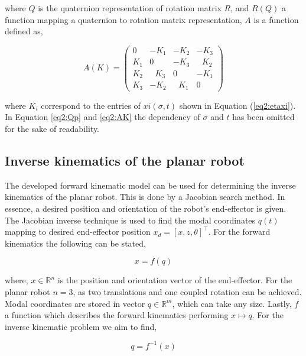 where $Q$ is the quaternion representation of rotation matrix $R$, and $R(Q)$ a function mapping a quaternion to rotation matrix representation, $A$ is a function defined as,


\begin{equation}
    A(K) = \begin{pmatrix} 0 & -K_1 & -K_2 & -K_3 \\ K_1 & 0 & -K_3 & \hspace{8pt}K_2 \\ K_2 & \hspace{8pt}K_3 & 0 & -K_1 \\ K_3 & -K_2 & \hspace{8pt}K_1 & 0 \end{pmatrix}
    \label{eq2:AK}
\end{equation}

where $K_i$ correspond to the entries of $xi(\sigma,t)$ shown in Equation (\ref{eq2:etaxi}). In Equation \ref{eq2:Qp} and \ref{eq2:AK} the dependency of $\sigma$ and $t$ has been omitted for the sake of readability.

\subsection{Inverse kinematics of the planar robot}

The developed forward kinematic model can be used for determining the inverse kinematics of the planar robot. This is done by a Jacobian search method. In essence, a desired position and orientation of the robot's end-effector is given. The Jacobian inverse technique is used to find the modal coordinates $q(t)$ mapping to desired end-effector position $x_d = [x,z,\theta]^\top$. For the forward kinematics the following can be stated,

\begin{equation}
    x = f(q)
\end{equation}

where, $x \in \mathbb{R}^n$ is the position and orientation vector of the end-effector. For the planar robot $n = 3$, as two translations and one coupled rotation can be achieved. Modal coordinates are stored in vector $q \in \mathbb{R}^m$, which can take any size. Lastly, $f$ a function which describes the forward kinematics performing $x \mapsto q$. For the inverse kinematic problem we aim to find,

\begin{equation}
    q = f^{-1}(x)
\end{equation}

